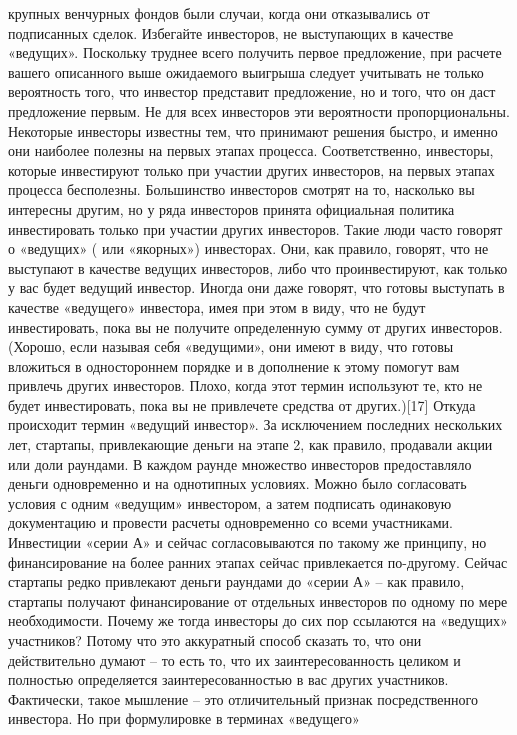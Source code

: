 \documentclass[ebook,12pt,oneside,openany]{memoir}
\begin{document}
крупных венчурных фондов были случаи, когда они отказывались от
подписанных сделок. Избегайте инвесторов, не выступающих в качестве
«ведущих». Поскольку труднее всего получить первое предложение, при
расчете вашего описанного выше ожидаемого выигрыша следует учитывать
не только вероятность того, что инвестор представит предложение, но и
того, что он даст предложение первым. Не для всех инвесторов эти
вероятности пропорциональны. Некоторые инвесторы известны тем, что
принимают решения быстро, и именно они наиболее полезны на первых
этапах процесса. Соответственно, инвесторы, которые инвестируют только
при участии других инвесторов, на первых этапах процесса бесполезны.
Большинство инвесторов смотрят на то, насколько вы интересны другим,
но у ряда инвесторов принята официальная политика инвестировать только
при участии других инвесторов. Такие люди часто говорят о «ведущих» (
или «якорных») инвесторах. Они, как правило, говорят, что не выступают
в качестве ведущих инвесторов, либо что проинвестируют, как только у
вас будет ведущий инвестор. Иногда они даже говорят, что готовы
выступать в качестве «ведущего» инвестора, имея при этом в виду, что
не будут инвестировать, пока вы не получите определенную сумму от
других инвесторов. (Хорошо, если называя себя «ведущими», они имеют в
виду, что готовы вложиться в одностороннем порядке и в дополнение к
этому помогут вам привлечь других инвесторов. Плохо, когда этот термин
используют те, кто не будет инвестировать, пока вы не привлечете
средства от других.)[17] Откуда происходит термин «ведущий инвестор».
За исключением последних нескольких лет, стартапы, привлекающие деньги
на этапе 2, как правило, продавали акции или доли раундами. В каждом
раунде множество инвесторов предоставляло деньги одновременно и на
однотипных условиях. Можно было согласовать условия с одним «ведущим»
инвестором, а затем подписать одинаковую документацию и провести
расчеты одновременно со всеми участниками. Инвестиции «серии А» и
сейчас согласовываются по такому же принципу, но финансирование на
более ранних этапах сейчас привлекается по-другому. Сейчас стартапы
редко привлекают деньги раундами до «серии А» – как правило, стартапы
получают финансирование от отдельных инвесторов по одному по мере
необходимости. Почему же тогда инвесторы до сих пор ссылаются на
«ведущих» участников? Потому что это аккуратный способ сказать то, что
они действительно думают – то есть то, что их заинтересованность
целиком и полностью определяется заинтересованностью в вас других
участников. Фактически, такое мышление – это отличительный признак
посредственного инвестора. Но при формулировке в терминах «ведущего»
\end{document}
